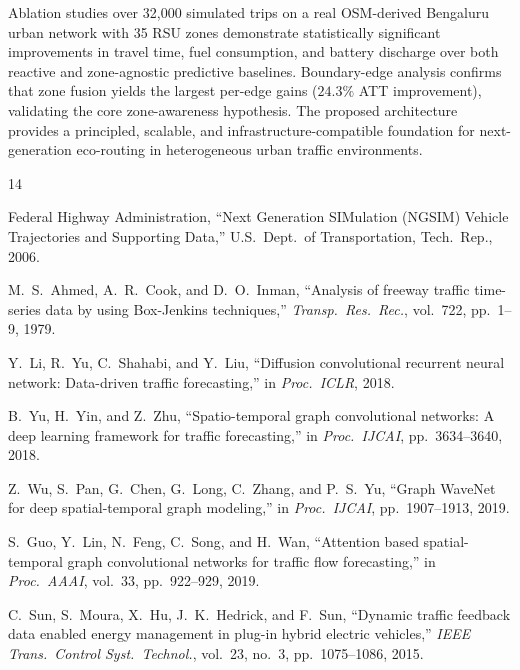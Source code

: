 \documentclass[journal,letterpaper,10pt]{IEEEtran}
\theoremstyle{definition}
\theoremstyle{remark}
\begin{document}
Ablation studies over 32,000 simulated trips on a real
OSM-derived Bengaluru urban network with 35 RSU zones demonstrate
statistically significant improvements in travel time, fuel
consumption, and battery discharge over both reactive and
zone-agnostic predictive baselines.  Boundary-edge analysis confirms
that zone fusion yields the largest per-edge gains ($24.3\%$ ATT
improvement), validating the core zone-awareness hypothesis.  The
proposed architecture provides a principled, scalable, and
infrastructure-compatible foundation for next-generation eco-routing
in heterogeneous urban traffic environments.

\begin{thebibliography}{14}

Federal Highway Administration,
``Next Generation SIMulation (NGSIM) Vehicle Trajectories and
  Supporting Data,''
  U.S.\ Dept.\ of Transportation, Tech.\ Rep., 2006.

M.~S.~Ahmed, A.~R.~Cook, and D.~O.~Inman,
``Analysis of freeway traffic time-series data by using Box-Jenkins
  techniques,''
  \emph{Transp.\ Res.\ Rec.}, vol.~722, pp.~1--9, 1979.

Y.~Li, R.~Yu, C.~Shahabi, and Y.~Liu,
``Diffusion convolutional recurrent neural network: Data-driven traffic
  forecasting,''
  in \emph{Proc.\ ICLR}, 2018.

B.~Yu, H.~Yin, and Z.~Zhu,
``Spatio-temporal graph convolutional networks: A deep learning framework
  for traffic forecasting,''
  in \emph{Proc.\ IJCAI}, pp.~3634--3640, 2018.

Z.~Wu, S.~Pan, G.~Chen, G.~Long, C.~Zhang, and P.~S.~Yu,
``Graph WaveNet for deep spatial-temporal graph modeling,''
  in \emph{Proc.\ IJCAI}, pp.~1907--1913, 2019.

S.~Guo, Y.~Lin, N.~Feng, C.~Song, and H.~Wan,
``Attention based spatial-temporal graph convolutional networks for
  traffic flow forecasting,''
  in \emph{Proc.\ AAAI}, vol.~33, pp.~922--929, 2019.

C.~Sun, S.~Moura, X.~Hu, J.~K.~Hedrick, and F.~Sun,
``Dynamic traffic feedback data enabled energy management in plug-in
  hybrid electric vehicles,''
  \emph{IEEE Trans.\ Control Syst.\ Technol.}, vol.~23, no.~3,
  pp.~1075--1086, 2015.


\end{thebibliography}
\end{document}
